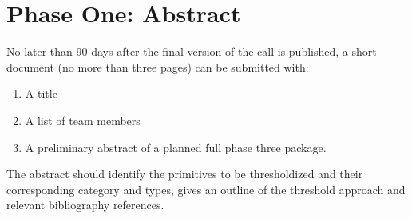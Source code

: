 \section{Phase One: Abstract}

No later than 90 days after the final version of the call is published, a short
document (no more than three pages) can be submitted with:

\begin{enumerate}
  \item A title
  \item A list of team members
  \item A preliminary abstract of a planned full phase three package.
\end{enumerate}

The abstract should identify the primitives to be thresholdized and their
corresponding category and types, gives an outline of the threshold approach
and relevant bibliography references.
